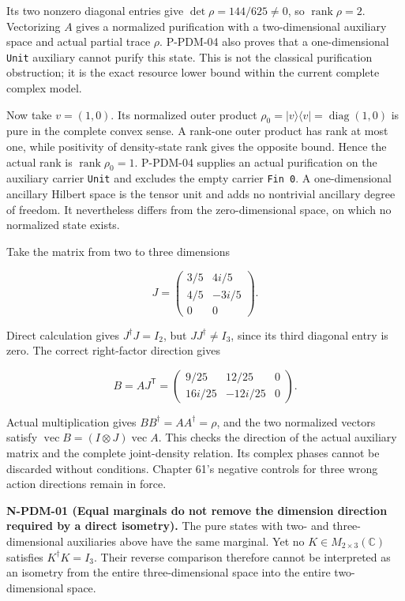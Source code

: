 \documentclass[
  11pt,
  oneside]{book}
\begin{document}
Its two nonzero diagonal entries give \(\det\rho=144/625\ne0\), so
\(\operatorname{rank}\rho=2\). Vectorizing \(A\) gives a normalized
purification with a two-dimensional auxiliary space and actual partial
trace \(\rho\). P-PDM-04 also proves that a one-dimensional
\texttt{Unit} auxiliary cannot purify this state. This is not the
classical purification obstruction; it is the exact resource lower bound
within the current complete complex model.

Now take \(v=(1,0)\). Its normalized outer product
\(\rho_0=|v\rangle\langle v|=\operatorname{diag}(1,0)\) is pure in the
complete convex sense. A rank-one outer product has rank at most one,
while positivity of density-state rank gives the opposite bound. Hence
the actual rank is \(\operatorname{rank}\rho_0=1\). P-PDM-04 supplies an
actual purification on the auxiliary carrier \texttt{Unit} and excludes
the empty carrier \texttt{Fin\ 0}. A one-dimensional ancillary Hilbert
space is the tensor unit and adds no nontrivial ancillary degree of
freedom. It nevertheless differs from the zero-dimensional space, on
which no normalized state exists.

Take the matrix from two to three dimensions

\[
J=\begin{pmatrix}
3/5&4i/5\\
4/5&-3i/5\\
0&0
\end{pmatrix}.
\]

Direct calculation gives \(J^\dagger J=I_2\), but \(JJ^\dagger\ne I_3\),
since its third diagonal entry is zero. The correct right-factor
direction gives

\[
B=AJ^{\mathsf T}
=\begin{pmatrix}
9/25&12/25&0\\
16i/25&-12i/25&0
\end{pmatrix}.
\]

Actual multiplication gives \(BB^\dagger=AA^\dagger=\rho\), and the two
normalized vectors satisfy
\(\operatorname{vec}B=(I\otimes J)\operatorname{vec}A\). This checks the
direction of the actual auxiliary matrix and the complete joint-density
relation. Its complex phases cannot be discarded without conditions.
Chapter 61's negative controls for three wrong action directions remain
in force.

\label{n-pdm-01}{}

\textbf{N-PDM-01 (Equal marginals do not remove the dimension direction
required by a direct isometry).} The pure states with two- and
three-dimensional auxiliaries above have the same marginal. Yet no
\(K\in M_{2\times3}(\mathbb C)\) satisfies \(K^\dagger K=I_3\). Their
reverse comparison therefore cannot be interpreted as an isometry from
the entire three-dimensional space into the entire two-dimensional
space.
\end{document}

